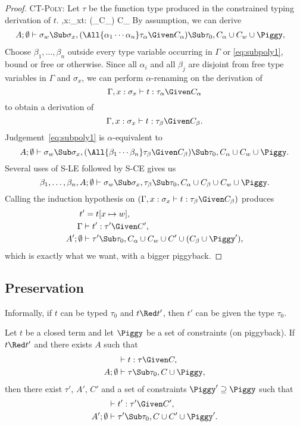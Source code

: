 \begin{proof}
\Case\textsc{CT-Poly}: Let $\tau$ be the function type produced
in the constrained typing derivation of $t$.
{\Gamma,x:\sigma_x\vdash t:
(\tau_\alpha\Given C_\alpha)
\Given C_\alpha}
%
By assumption, we can derive
\begin{align}
A;\Exigent &\vdash \sigma_w\Sub\sigma_x,
(\All{\alpha_1\cdots\alpha_n}\tau_\alpha\Given
C_\alpha)\Sub\tau_0,
C_\alpha\cup C_w\cup\Piggy,
\label{eq:subpoly1}
\end{align}
Choose $\beta_1,\ldots,\beta_n$ outside every type variable
occurring in $\Gamma$ or \eqref{eq:subpoly1}, bound or free or
otherwise. Since all $\alpha_i$ and all $\beta_j$ are disjoint
from free type variables in $\Gamma$ and $\sigma_x$, we can
perform $\alpha$-renaming on the derivation of
\[
\Gamma,x:\sigma_x\vdash t : \tau_\alpha\Given C_\alpha
\]
to obtain a derivation of
\def\tBeta{\Gamma,x:\sigma_x\vdash t : \tau_\beta\Given C_\beta}
\[
\tBeta.
\]
Judgement~\eqref{eq:subpoly1} is $\alpha$-equivalent to
\[
A;\Exigent \vdash \sigma_w\Sub\sigma_x,
(\All{\beta_1\cdots\beta_n}\tau_\beta\Given
C_\beta)\Sub\tau_0,
C_\alpha\cup C_w\cup\Piggy.
\]
Several uses of \textsc{S-LE} followed by \textsc{S-CE} gives us
\[
\beta_1,\ldots,\beta_n,A;\Exigent \vdash \sigma_w\Sub\sigma_x,
\tau_\beta\Sub\tau_0,
C_\alpha\cup C_\beta\cup C_w\cup\Piggy.
\]
Calling the induction hypothesis on $(\tBeta)$ produces
\begin{align}
t&'=t[x\mapsto\Xdef],\notag\\
\Gamma&\vdash t':\tau'\Given C',
\label{eq:subpoly2}
\\
A';\Exigent&\vdash
\tau'\Sub\tau_0,
C_\alpha\cup C_w\cup C'\cup(C_\beta\cup\Piggy'),
\label{eq:subpoly3}
\end{align}
which is exactly what we want, with a bigger piggyback.
\end{proof}
\subsection{Preservation}
\label{preservation}

Informally, if $t$ can be typed $\tau_0$ and $t\Red t'$,
then $t'$ can be given the type $\tau_0$.

Let $t$ be a closed term and let $\Piggy$ be a set of constraints
(on piggyback). If $t\Red t'$ and there exists $A$ such that
\begin{align*}
&\vdash t:\tau \Given C,\\
A;\emptyset&\vdash \tau\Sub\tau_0,C\cup\Piggy,
\end{align*}
then there exist $\tau'$, $A'$, $C'$ and a set of constraints
$\Piggy'\supseteq\Piggy$ such that
\begin{align*}
&\vdash t':\tau'\Given C',\\
A';\emptyset&\vdash \tau'\Sub\tau_0,C\cup C'\cup\Piggy'.
\end{align*}


